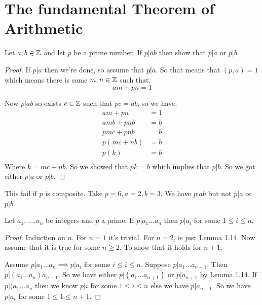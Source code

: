 \section{The fundamental Theorem of Arithmetic}
\begin{lemma}[Euclid]
Let $a, b  \in \mathbb{Z}$  and let  $p$ be a prime number. If $ p | ab$ then show that  $p | a$ or  $p | b$.
\end{lemma}
\begin{proof}
    If $p | a$ then we're done, so assume that  $ p \not | a$. So that means that  $(p, a) = 1$ which means there is some $m,n \in \mathbb{Z}$ such that,
    $$ am + pn = 1 $$ 

    Now $p | ab$ so exists  $c \in \mathbb{Z}$ such that  $pc = ab$, so we have, 
     \begin{align*}
         am + pn &= 1\\
         amb + pnb &= b\\
         pmc + pnb &= b\\
         p(mc + nb) &= b\\
         p(k) &= b\\
    \end{align*}
    Where $k = mc + nb$. So we showed that  $pk = b$ which implies that  $ p | b$. So we got either  $p | a$ or  $p | b$.
\end{proof}

\begin{remark}
    This fail if $p$ is composite. Take $ p = 6, a= 2, b = 3$. We have $p | ab$ but not  $p | a$ or  $p | b$. 
\end{remark}

\begin{corollary}
    Let $a_1,\dots,a_n$ be integers and $p$ a prime. If $p | a_1 \dots a_n$ then $p | a_i$ for some  $ 1 \le i \le n$.
\end{corollary}
\begin{proof}
    Induction on $n$. For $n = 1$ it's trivial. For $n = 2$, is just Lemma 1.14. Now assume that it is true for some $n \ge 2$. To show that it holds for  $n + 1$.

    \vspace{1em}

    Assume $p | a_1\dots a_n \implies p | a_i$  for some $i \le i \le n$. Suppose $p | a_1\dots a_{n + 1}$. Then  $p | (a_1 \dots a_n) a_{n + 1}$. So we have either $p | (a_1\dots a_{n + 1})$ or $p | a_{n + 1}$ by Lemma 1.14.  If  $p | (a_1\dots a_n$ then we know $p | i$ for some  $1 \le i \le n$ else we have  $p | a_{n + 1}$. So we have  $p | a_i$ for some  $1 \le 1 \le n + 1$.
\end{proof}

